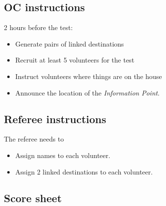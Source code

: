 \subsection*{OC instructions}
2 hours before the test:
\begin{itemize}
	\item Generate pairs of linked destinations
	\item Recruit at least 5 volunteers for the test
	\item Instruct volunteers where things are on the house
	\item Announce the location of the \emph{Information Point}.
\end{itemize}

\subsection*{Referee instructions}
The referee needs to
\begin{itemize}
	\item Assign names to each volunteer.
	\item Assign 2 linked destinations to each volunteer.
\end{itemize}

\subsection*{Score sheet}

